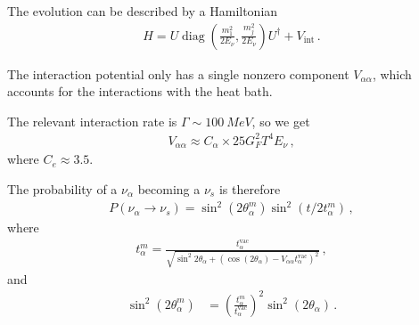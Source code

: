 \documentclass[main.tex]{subfiles}
\begin{document}
The evolution can be described by a Hamiltonian  
%
\begin{align}
H = U \operatorname{diag} (\frac{m_1^2}{2 E_\nu }, \frac{m_j^2}{2 E_\nu }) U ^\dag + V _{\text{int}}
\,.
\end{align}

The interaction potential only has a single nonzero component \(V_{\alpha \alpha}\), 
which accounts for the interactions with the heat bath. 

The relevant interaction rate is \(\Gamma \sim \SI{100}{MeV}\), 
so we get 
%
\begin{align}
V_{\alpha \alpha } \approx C_\alpha \times 25 G_F^2 T^4 E_\nu 
\,,
\end{align}
%
where \(C_e \approx 3.5\). 

The probability of a \(\nu _\alpha \) becoming a \(\nu _s\) is therefore 
%
\begin{align}
P(\nu _\alpha \to \nu _s) = \sin^2(2 \theta _\alpha^m) \sin^2(t / 2 t_\alpha^m)
\,,
\end{align}
%
where 
%
\begin{align}
t_\alpha^m = \frac{t_\alpha^{\text{vac}}}{\sqrt{\sin^2 2 \theta _\alpha + (\cos(2 \theta _\alpha ) - V_{\alpha \alpha } t_\alpha^{\text{vac}})^2}}
\,,
\end{align}
%
and 
%
\begin{align}
\sin^2(2 \theta _\alpha^m) &= \left(\frac{t_\alpha^m}{t_\alpha^{\text{vac}}} \right)^2
\sin^2 (2 \theta _\alpha )
\,.
\end{align}
\end{document}
